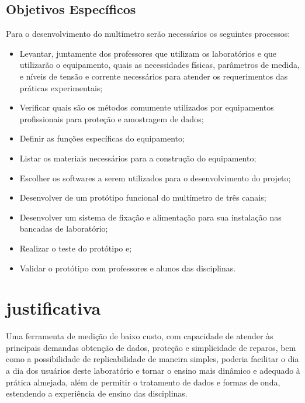 \subsection{Objetivos Específicos}\label{sec:objespec}
Para o desenvolvimento do multímetro serão necessários os seguintes processos:

\begin{itemize}
    \item Levantar, juntamente dos professores que utilizam os laboratórios e que utilizarão o equipamento, quais as necessidades físicas, parâmetros de medida, e níveis de tensão e corrente necessários para atender os requerimentos das práticas experimentais;
    \item Verificar quais são os métodos comumente utilizados por equipamentos profissionais para proteção e amostragem de dados;
    \item Definir as funções específicas do equipamento;
    \item Listar os materiais necessários para a construção do equipamento;
    \item Escolher os softwares a serem utilizados para o desenvolvimento do projeto;
    \item Desenvolver de um protótipo funcional do multímetro de três canais;
    \item Desenvolver um sistema de fixação e alimentação para sua instalação nas bancadas de laboratório;
    \item Realizar o teste do protótipo e;
    \item Validar o protótipo com professores e alunos das disciplinas.
\end{itemize}

\section{justificativa}\label{sec:justificativa}
Uma ferramenta de medição de baixo custo, com capacidade de atender às principais demandas obtenção de dados, proteção e simplicidade de reparos, bem como a possibilidade de replicabilidade de maneira simples, poderia facilitar o dia a dia dos usuários deste laboratório e tornar o ensino mais dinâmico e adequado à prática almejada, além de permitir o tratamento de dados e formas de onda, estendendo a experiência de ensino das disciplinas.


